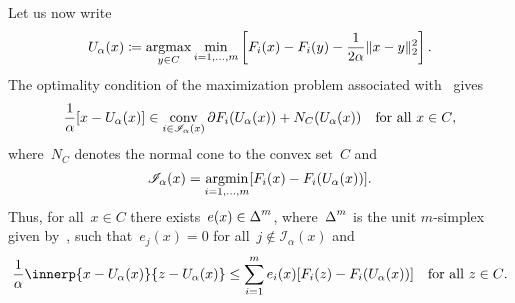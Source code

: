 \documentclass[../../main]{subfiles}
\begin{document}
Let us now write
\begin{equation} \label{eq:reg_gap_MO_sol}
    U_\alpha(x) \coloneqq \operatorname*{argmax}_{y \in C} \min_{i = 1, \dots, m} \left[ F_i(x) - F_i(y) - \frac{1}{2 \alpha}\lVert x - y\rVert_2^2 \right] 
.\end{equation} 
The optimality condition of the maximization problem associated with~ gives
\begin{equation}
    \frac{1}{\alpha}  [ x - U_\alpha(x) ] \in \operatorname*{conv}_{i \in \mathscr{I}_\alpha(x)} \partial F_i(U_\alpha(x)) + N_C(U_\alpha(x)) \quad \text{for all~$x \in C$}
,\end{equation}
where~$N_C$ denotes the normal cone to the convex set~$C$ and
\begin{equation}
    \mathscr{I}_\alpha(x) = \operatorname*{argmin}_{i = 1, \dots, m} [ F_i(x) - F_i(U_\alpha(x)) ]
.\end{equation}
Thus, for all~$x \in C$ there exists~$e(x) \in \operatorname{\Delta}^m$, where~$\operatorname{\Delta}^m$ is the unit $m$-simplex given by~, such that~$e_j(x) = 0$ for all~$j \notin \mathscr{I}_\alpha(x)$ and
\begin{equation} \label{eq:reg_gap_MO_opt}
    \frac{1}{\alpha} \innerp{x - U_\alpha(x)}{z - U_\alpha(x)} \le \sum_{i = 1}^{m} e_i(x) [ F_i(z) - F_i(U_\alpha(x)) ] \forallcondition{z \in C}
.\end{equation} 
\end{document}
